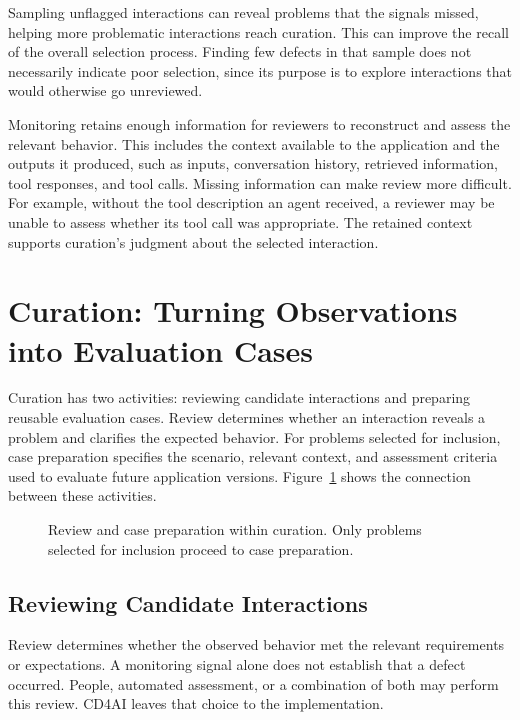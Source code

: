 Sampling unflagged interactions can reveal problems that the signals missed,
helping more problematic interactions reach curation. This can improve the
recall of the overall selection process. Finding few defects in that sample
does not necessarily indicate poor selection, since its purpose is to explore
interactions that would otherwise go unreviewed.

Monitoring retains enough information for reviewers to reconstruct and assess
the relevant behavior. This includes the context available to the application
and the outputs it produced, such as inputs, conversation history, retrieved
information, tool responses, and tool calls.
Missing information can make review more difficult. For example, without the
tool description an agent received, a reviewer may be unable to assess whether
its tool call was appropriate. The retained context supports curation's
judgment about the selected interaction.

\section{Curation: Turning Observations into Evaluation Cases}
\label{sec:cd4ai-curation}

Curation has two activities: reviewing candidate interactions and preparing
reusable evaluation cases. Review determines whether an interaction reveals
a problem and clarifies the expected behavior. For problems selected for
inclusion, case preparation specifies the scenario, relevant context, and
assessment criteria used to evaluate future application versions.
Figure~\ref{fig:cd4ai-curation-activities} shows the connection between these
activities.

\begin{figure}[H]
  \centering
  
  \caption{Review and case preparation within curation. Only problems selected
    for inclusion proceed to case preparation.}
  \label{fig:cd4ai-curation-activities}
\end{figure}

\subsection{Reviewing Candidate Interactions}

Review determines whether the observed behavior met the relevant requirements
or expectations. A monitoring signal alone does not establish that a defect
occurred. People, automated assessment, or a combination of both may perform
this review. CD4AI leaves that choice to the implementation.

